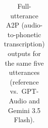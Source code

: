 \begin{table}[t]
\begin{tabular}{p{} p{}}
\bottomrule
\end{tabular}
\caption{Full-utterance A2P (audio-to-phonetic transcription) outputs for the same five utterances (reference vs.\ GPT-Audio and Gemini 3.5 Flash).}
\label{tab:a2p-examples-full}
\end{table}
